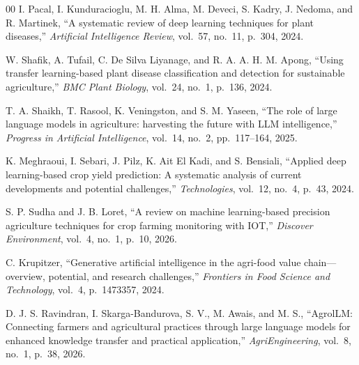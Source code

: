 \documentclass[conference]{IEEEtran}
\begin{document}
\begin{thebibliography}{00}
 I. Pacal, I. Kunduracioglu, M. H. Alma, M. Deveci, S. Kadry, J. Nedoma, and R. Martinek, ``A systematic review of deep learning techniques for plant diseases,'' \textit{Artificial Intelligence Review}, vol.~57, no.~11, p.~304, 2024.

 W. Shafik, A. Tufail, C. De Silva Liyanage, and R. A. A. H. M. Apong, ``Using transfer learning-based plant disease classification and detection for sustainable agriculture,'' \textit{BMC Plant Biology}, vol.~24, no.~1, p.~136, 2024.

 T. A. Shaikh, T. Rasool, K. Veningston, and S. M. Yaseen, ``The role of large language models in agriculture: harvesting the future with LLM intelligence,'' \textit{Progress in Artificial Intelligence}, vol.~14, no.~2, pp.~117--164, 2025.

 K. Meghraoui, I. Sebari, J. Pilz, K. Ait El Kadi, and S. Bensiali, ``Applied deep learning-based crop yield prediction: A systematic analysis of current developments and potential challenges,'' \textit{Technologies}, vol.~12, no.~4, p.~43, 2024.

 S. P. Sudha and J. B. Loret, ``A review on machine learning-based precision agriculture techniques for crop farming monitoring with IOT,'' \textit{Discover Environment}, vol.~4, no.~1, p.~10, 2026.

 C. Krupitzer, ``Generative artificial intelligence in the agri-food value chain---overview, potential, and research challenges,'' \textit{Frontiers in Food Science and Technology}, vol.~4, p.~1473357, 2024.

 D. J. S. Ravindran, I. Skarga-Bandurova, S. V., M. Awais, and M. S., ``AgrolLM: Connecting farmers and agricultural practices through large language models for enhanced knowledge transfer and practical application,'' \textit{AgriEngineering}, vol.~8, no.~1, p.~38, 2026.

\end{thebibliography}
\end{document}
